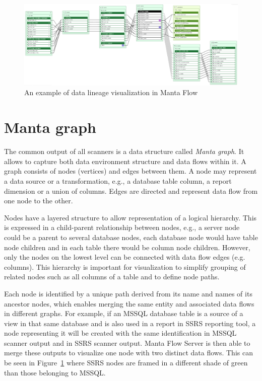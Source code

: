 \begin{figure}[ht]\centering
\includegraphics[width=1.0\textwidth]{img/lineage_example.PNG}
\caption{An example of data lineage visualization in Manta Flow}
\label{fig01:lineage}
\end{figure}  

\section{Manta graph}

The common output of all scanners is a data structure called \textit{Manta graph}. It allows to capture both data environment structure and data flows within it. A graph consists of nodes (vertices) and edges between them. A node may represent a data source or a transformation, e.g., a database table column, a report dimension or a union of columns. Edges are directed and represent data flow from one node to the other.
\par
Nodes have a layered structure to allow representation of a logical hierarchy. This is expressed in a child-parent relationship between nodes, e.g., a server node could be a parent to several database nodes, each database node would have table node children and in each table there would be column node children. However, only the nodes on the lowest level can be connected with data flow edges (e.g. columns). This hierarchy is important for visualization to simplify grouping of related nodes such as all columns of a table and to define node paths.
\par
Each node is identified by a unique path derived from its name and names of its ancestor nodes, which enables merging the same entity and associated data flows in different graphs. For example, if an MSSQL database table is a source of a view in that same database and is also used in a report in SSRS reporting tool, a node representing it will be created with the same identification in MSSQL scanner output and in SSRS scanner output. Manta Flow Server is then able to merge these outputs to visualize one node with two distinct data flows. This can be seen in Figure~\ref{fig01:lineage} where SSRS nodes are framed in a different shade of green than those belonging to MSSQL.


